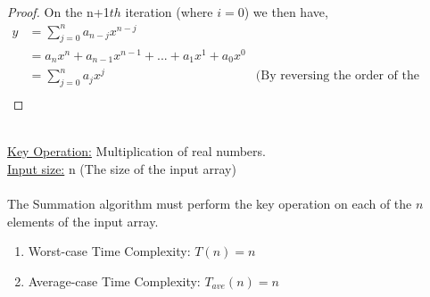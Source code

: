 \documentclass[12pt]{article}
\newenvironment{question}[2][Question]{\begin{trivlist}
\item[\hskip \labelsep {\bfseries #1}\hskip \labelsep {\bfseries #2.}]}{\end{trivlist}}
\begin{document}
\begin{question}{1 (i)}
\begin{proof}
  On the n+1$th$ iteration (where $i = 0$) we then have,
  \begin{align*}
    y & = \sum_{j=0}^{n} a_{n - j}x^{n - j}\\
      & = a_{n}x^{n} + a_{n-1}x^{n-1} + ... + a_{1}x^{1} + a_{0}x^{0}\\
      & = \sum_{j=0}^{n} a_{j}x^{j} & \text{(By reversing the order of the terms)}\\
  \end{align*}

  \end{proof}
\end{question}

\begin{question}{1 (ii)}
  \leavevmode \\
  \underline{Key Operation:} Multiplication of real numbers. \\
  \underline{Input size:} n (The size of the input array) \\ \\
  The Summation algorithm must perform the key operation on each of
  the $n$ elements of the input array.
  \begin{enumerate}
    \item Worst-case Time Complexity: $T(n) = n$
    \item Average-case Time Complexity: $T_{ave}(n) = n$
  \end{enumerate}
\end{question}
\end{document}
